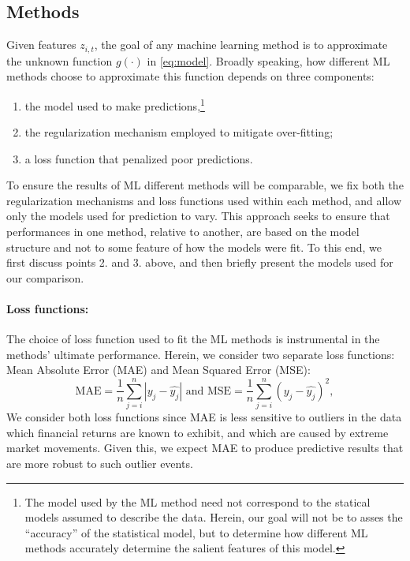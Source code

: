 \documentclass{article}
\begin{document}
\subsection{Methods}Given features $z_{i,t}$, the goal of any machine learning method is to approximate the unknown function $g(\cdot)$ in \ref{eq:model}.  Broadly speaking, how different ML methods choose to approximate this function depends on three components:
\begin{enumerate}
	\item the model used to make predictions,\footnote{The model used by the ML method need not correspond to the statical models assumed to describe the data. Herein, our goal will not be to asses the ``accuracy'' of the statistical model, but to determine how different ML methods accurately determine the salient features of this model. }
	\item the regularization mechanism employed to mitigate over-fitting; 
	\item a loss function that penalized poor predictions. 
\end{enumerate}


To ensure the results of ML different methods will be comparable, we fix both the regularization mechanisms and loss functions used within each method, and allow only the models used for prediction to vary. This approach seeks to ensure that performances in one method, relative to another, are based on the model structure and not to some feature of how the models were fit. To this end, we first discuss points 2. and 3. above, and then briefly present the models used for our comparison. 
\paragraph{Loss functions:}The choice of loss function used to fit the ML methods is instrumental in the methods' ultimate performance. Herein, we consider two separate loss functions: Mean Absolute Error (MAE) and Mean Squared Error (MSE):
\begin{equation*}
\text{MAE} = \frac{1}{n} \sum_{j = i}^{n} |y_j - \hat{y_j}|\text{ and }
\text{MSE} = \frac{1}{n} \sum_{j = i}^{n} \left( y_j - \hat{y_j}\right) ^2,
\end{equation*}We consider both loss functions since MAE is less sensitive to outliers in the data which financial returns are known to exhibit, and which are caused by extreme market movements. Given this, we expect MAE to  produce predictive results that are more robust to such outlier events. 
\end{document}
